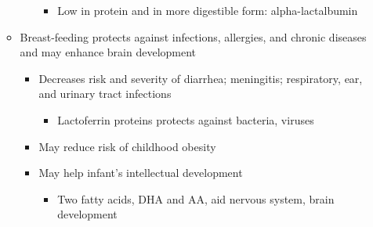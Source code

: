 \documentclass[12pt]{article}
\begin{document}
\begin{itemize}
\begin{itemize}
\begin{itemize}
                                    \begin{itemize}
                                        \item Low in protein and in more digestible form: alpha-lactalbumin
                                    \end{itemize}
                            \end{itemize}
                        \item Breast-feeding protects against infections, allergies, and chronic diseases and may enhance brain development
                            \begin{itemize}
                                \item Decreases risk and severity of diarrhea; meningitis; respiratory, ear, and urinary tract infections
                                    \begin{itemize}
                                        \item Lactoferrin proteins protects against bacteria, viruses
                                    \end{itemize}
                                \item May reduce risk of childhood obesity
                                \item May help infant's intellectual development
                                    \begin{itemize}
                                        \item Two fatty acids, DHA and AA, aid nervous system, brain development
                                    \end{itemize}
                            \end{itemize}
                    \end{itemize}
            \end{itemize}
\end{document}
